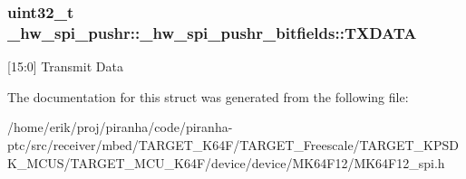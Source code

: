 \subsubsection[{\texorpdfstring{T\+X\+D\+A\+TA}{TXDATA}}]{\setlength{\rightskip}{0pt plus 5cm}uint32\+\_\+t \+\_\+hw\+\_\+spi\+\_\+pushr\+::\+\_\+hw\+\_\+spi\+\_\+pushr\+\_\+bitfields\+::\+T\+X\+D\+A\+TA}\hypertarget{struct__hw__spi__pushr_1_1__hw__spi__pushr__bitfields_a4db75f8abed699acc6be847408abfe5e}{}\label{struct__hw__spi__pushr_1_1__hw__spi__pushr__bitfields_a4db75f8abed699acc6be847408abfe5e}
\mbox{[}15\+:0\mbox{]} Transmit Data 

The documentation for this struct was generated from the following file\+:\begin{DoxyCompactItemize}
\item 
/home/erik/proj/piranha/code/piranha-\/ptc/src/receiver/mbed/\+T\+A\+R\+G\+E\+T\+\_\+\+K64\+F/\+T\+A\+R\+G\+E\+T\+\_\+\+Freescale/\+T\+A\+R\+G\+E\+T\+\_\+\+K\+P\+S\+D\+K\+\_\+\+M\+C\+U\+S/\+T\+A\+R\+G\+E\+T\+\_\+\+M\+C\+U\+\_\+\+K64\+F/device/device/\+M\+K64\+F12/M\+K64\+F12\+\_\+spi.\+h\end{DoxyCompactItemize}
